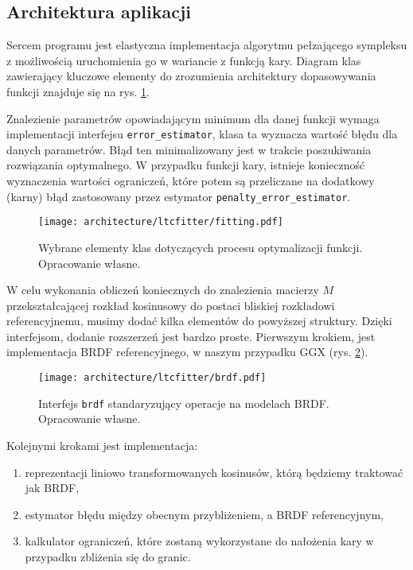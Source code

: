 \documentclass[../main.tex]{subfiles}
\newcommand{\graphvizscale}{0.09}
\begin{document}
\subsection{Architektura aplikacji}

Sercem programu jest elastyczna implementacja algorytmu pełzającego sympleksu z możliwością uruchomienia go w wariancie z funkcją kary. Diagram klas zawierający kluczowe elementy do zrozumienia architektury dopasowywania funkcji znajduje się na rys. \ref{fig:FunctionSolveClassDiagram}. 

Znalezienie parametrów opowiadającym minimum dla danej funkcji wymaga implementacji interfejsu \texttt{error\_estimator}, klasa ta wyznacza wartość błędu dla danych parametrów. Błąd ten minimalizowany jest w trakcie poszukiwania rozwiązania optymalnego. W przypadku funkcji kary, istnieje konieczność wyznaczenia wartości ograniczeń, które potem są przeliczane na dodatkowy (karny) błąd zastosowany przez estymator \texttt{penalty\_error\_estimator}. 

\begin{figure}[h]
    \centering
    \texttt{[image: architecture/ltcfitter/fitting.pdf]}
    \caption{Wybrane elementy klas dotyczących procesu optymalizacji funkcji. Opracowanie własne.}
    \label{fig:FunctionSolveClassDiagram}
\end{figure}

W celu wykonania obliczeń koniecznych do znalezienia macierzy $M$ przekształcającej rozkład kosinusowy do postaci bliskiej rozkładowi referencyjnemu, musimy dodać kilka elementów do powyższej struktury. Dzięki interfejsom, dodanie rozszerzeń jest bardzo proste. Pierwszym krokiem, jest implementacja BRDF referencyjnego, w naszym przypadku GGX (rys. \ref{fig:BRDFClassDiagram}).

\begin{figure}[h]
    \centering
    \texttt{[image: architecture/ltcfitter/brdf.pdf]}
    \caption{Interfejs \texttt{brdf} standaryzujący operacje na modelach BRDF. Opracowanie własne.}
    \label{fig:BRDFClassDiagram}
\end{figure}

Kolejnymi krokami jest implementacja: 
\begin{enumerate}
    \item reprezentacji liniowo transformowanych kosinusów, którą będziemy traktować jak BRDF,
    \item estymator błędu między obecnym przybliżeniem, a BRDF referencyjnym,
    \item kalkulator ograniczeń, które zostaną wykorzystane do nałożenia kary w przypadku zbliżenia się do granic.
\end{enumerate}
\end{document}
